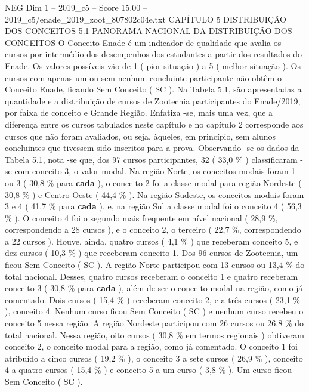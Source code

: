 \begin{textsample}{NEG Dim 1 – 2019\_c5 – Score 15.00 – 2019\_c5/enade\_2019\_zoot\_807802c04e.txt}  \label{ex:f1_neg_392}
CAPÍTULO 5 DISTRIBUIÇÃO DOS CONCEITOS 5.1 PANORAMA NACIONAL DA DISTRIBUIÇÃO DOS CONCEITOS O Conceito Enade é um indicador de qualidade que avalia os cursos por intermédio dos desempenhos dos estudantes a partir dos resultados do Enade.
Os valores possíveis vão de 1 ( pior situação ) a 5 ( melhor situação ).
Os cursos com apenas um ou sem nenhum concluinte participante não obtêm o Conceito Enade, ficando Sem Conceito ( SC ).
Na Tabela 5.1, são apresentadas a quantidade e a distribuição de cursos de Zootecnia participantes do Enade/2019, por faixa de conceito e Grande Região.
Enfatiza -se, mais uma vez, que a diferença entre os cursos tabulados neste capítulo e no capítulo 2 corresponde aos cursos que não foram avaliados, ou seja, àqueles, em princípio, sem alunos concluintes que tivessem sido inscritos para a prova.
Observando -se os dados da Tabela 5.1, nota -se que, dos 97 cursos participantes, 32 ( 33,0 \% ) classificaram -se com conceito 3, o valor modal.
Na região Norte, os conceitos modais foram 1 ou 3 ( 30,8 \% para \textbf{cada} ), o conceito 2 foi a classe modal para região Nordeste ( 30,8 \% ) e Centro-Oeste ( 44,4 \% ).
Na região Sudeste, os conceitos modais foram 3 e 4 ( 41,7 \% para \textbf{cada} ), e, na região Sul a classe modal foi o conceito 4 ( 56,3 \% ).
O conceito 4 foi o segundo mais frequente em nível nacional ( 28,9 \%, correspondendo a 28 cursos ), e o conceito 2, o terceiro ( 22,7 \%, correspondendo a 22 cursos ).
Houve, ainda, quatro cursos ( 4,1 \% ) que receberam conceito 5, e dez cursos ( 10,3 \% ) que receberam conceito 1.
Dos 96 cursos de Zootecnia, um ficou Sem Conceito ( SC ).
A região Norte participou com 13 cursos ou 13,4 \% do total nacional.
Desses, quatro cursos receberam o conceito 1 e quatro receberam conceito 3 ( 30,8 \% para \textbf{cada} ), além de ser o conceito modal na região, como já comentado.
Dois cursos ( 15,4 \% ) receberam conceito 2, e a três cursos ( 23,1 \% ), conceito 4.
Nenhum curso ficou Sem Conceito ( SC ) e nenhum curso recebeu o conceito 5 nessa região.
A região Nordeste participou com 26 cursos ou 26,8 \% do total nacional.
Nessa região, oito cursos ( 30,8 \% em termos regionais ) obtiveram conceito 2, o conceito modal para a região, como já comentado.
O conceito 1 foi atribuído a cinco cursos ( 19,2 \% ), o conceito 3 a sete cursos ( 26,9 \% ), conceito 4 a quatro cursos ( 15,4 \% ) e conceito 5 a um curso ( 3,8 \% ).
Um curso ficou Sem Conceito ( SC ).

\end{textsample}
